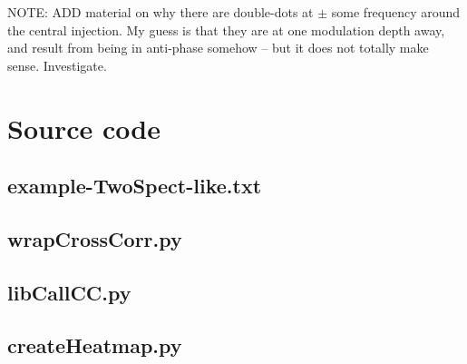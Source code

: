 \documentclass{article}
\begin{document}
NOTE: ADD material on why there are double-dots at $\pm$ some frequency around the central injection. My guess is that they are at one modulation depth away, and result from being in anti-phase somehow -- but it does not totally make sense. Investigate.

\newpage

\appendix
\section{Source code}
\label{source_code_appendix}

\subsection{example-TwoSpect-like.txt}

\subsection{wrapCrossCorr.py}

\subsection{libCallCC.py}

\subsection{createHeatmap.py}

\end{document}
